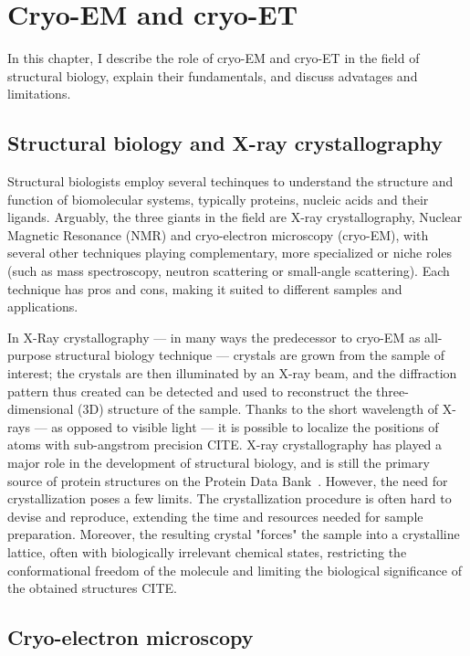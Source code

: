 \chapter{Cryo-EM and cryo-ET}

In this chapter, I describe the role of cryo-EM and cryo-ET in the field of structural biology, explain their fundamentals, and discuss advatages and limitations.

\section{Structural biology and X-ray crystallography}
Structural biologists employ several techinques to understand the structure and function of biomolecular systems, typically proteins, nucleic acids and their ligands. Arguably, the three giants in the field are X-ray crystallography, Nuclear Magnetic Resonance (NMR) and cryo-electron microscopy (cryo-EM), with several other techniques playing complementary, more specialized or niche roles (such as mass spectroscopy, neutron scattering or small-angle scattering). Each technique has pros and cons, making it suited to different samples and applications.

In X-Ray crystallography --- in many ways the predecessor to cryo-EM as all-purpose structural biology technique --- crystals are grown from the sample of interest; the crystals are then illuminated by an X-ray beam, and the diffraction pattern thus created can be detected and used to reconstruct the three-dimensional (3D) structure of the sample. Thanks to the short wavelength of X-rays --- as opposed to visible light --- it is possible to localize the positions of atoms with sub-angstrom precision CITE.
X-ray crystallography has played a major role in the development of structural biology, and is still the primary source of protein structures on the Protein Data Bank~\cite{bermanProteinDataBank2000,bermanAnnouncingWorldwideProtein2003}. However, the need for crystallization poses a few limits. The crystallization procedure is often hard to devise and reproduce, extending the time and resources needed for sample preparation. Moreover, the resulting crystal "forces" the sample into a crystalline lattice, often with biologically irrelevant chemical states, restricting the conformational freedom of the molecule and limiting the biological significance of the obtained structures CITE.

\section{Cryo-electron microscopy}

